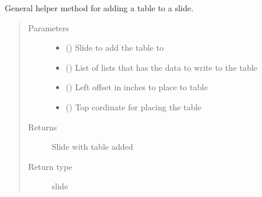 \documentclass[letterpaper,10pt,english]{sphinxmanual}
\begin{document}
\begin{fulllineitems}
\begin{fulllineitems}
\end{fulllineitems}


\begin{fulllineitems}
\label{\detokenize{polo.utils:polo.utils.io_utils.PptxWriter.add_table_to_slide}}
General helper method for adding a table to a slide.
\begin{quote}\begin{description}
\item[{Parameters}] \leavevmode\begin{itemize}
\item {} 
 () \textendash{} Slide to add the table to

\item {} 
 () \textendash{} List of lists that has the data to write to the table

\item {} 
 () \textendash{} Left offset in inches to place to table

\item {} 
 () \textendash{} Top cordinate for placing the table

\end{itemize}

\item[{Returns}] \leavevmode
Slide with table added

\item[{Return type}] \leavevmode
slide

\end{description}\end{quote}

\end{fulllineitems}



\end{fulllineitems}
\end{document}
